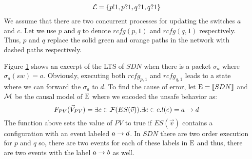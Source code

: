 \begin{example}
\begin{equation*}
\begin{aligned}[c]
            \mathcal{L} & = \{p!1,p?1,q?1,q?1\}                \\
        \end{aligned}
    \end{equation*}
    We assume that there are two concurrent processes for updating
    the switches $a$ and $c$.
    Let we use $p$ and $q$ to denote $rcfg(p,1)$ and
    $rcfg(q,1)$ respectively.
    Thus, $p$ and $q$ replace the solid green and orange
    paths in the network with dashed paths respectively.
    \begin{figure}
        \centering
        \caption{}
        \label{fig:blacklist:lts}
    \end{figure}
    Figure \ref{fig:blacklist:lts} shows an excerpt of the LTS of $SDN$ 
    when there is a packet $\sigma_a$ where $\sigma_a(sw) = a$.
    Obviously, executing both $rcfg_{p,1}$ and $rcfg_{q,1}$ leads
    to a state where we can forward the $\sigma_a$ to $d$.
    To find the cause of error, let $\mathrm{E} = \llbracket SDN \rrbracket$ and $\mathcal{M}$ 
    be the causal model of $\mathrm{E}$ where we encoded the unsafe behavior 
    as:
    \begin{equation*}
        F_{PV}(\vec V_{PV}) = \exists c \in \mathcal{F}(ES(\vec v)). \exists e \in c. l(e) = a\rightarrow d
    \end{equation*}
    The function above sets the value of $PV$ to true if $ES(\vec v)$ 
    contains a configuration with an event labeled $a \rightarrow d$.
    In $SDN$ there are two order execution for $p$ and $q$ so,
    there are two events for each of these labels in $\mathrm{E}$ 
    and thus, there are two events with the label $a \rightarrow b$ as well.

\end{example}
